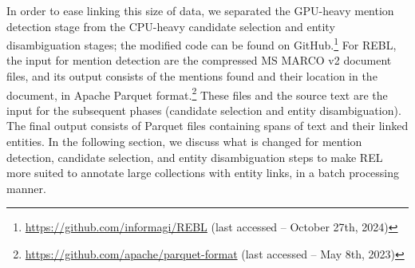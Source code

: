 In order to ease linking this size of data, we separated the GPU-heavy mention detection stage from the CPU-heavy candidate selection and entity disambiguation stages; the modified code can be found on GitHub.\footnote{\url{https://github.com/informagi/REBL} (last accessed -- October 27th, 2024)}
For REBL, the input for mention detection are the compressed MS MARCO v2 document files, and its output consists of the mentions found and their location in the document, in Apache Parquet format.\footnote{\url{https://github.com/apache/parquet-format} (last accessed -- May 8th, 2023)}
These files and the source text are the input for the subsequent phases (candidate selection and entity disambiguation). The final output consists of Parquet files containing spans of text and their linked entities. 
In the following section, we discuss what is changed for mention detection, candidate selection, and entity disambiguation steps to make REL more suited to annotate large collections with entity links, in a batch processing manner.  

